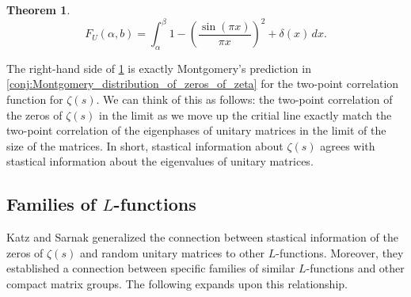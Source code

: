 \documentclass[12pt]{book}
\newtheorem{theorem}{Theorem}[section]
\theoremstyle{definition}\newframedtheorem{method}{Method}
\renewcommand{\a}{\alpha}
\renewcommand{\b}{\beta}
\renewcommand{\d}{\delta}
\newcommand{\z}{\zeta}
\newcommand{\<}{\langle}
\renewcommand{\>}{\rangle}
\begin{document}
      \begin{theorem}\label{thm:Dyson_unitary_distribution}
      \phantom{ }
      \[
        F_{U}(\a,b) = \int_{\a}^{\b}1-\left(\frac{\sin(\pi x)}{\pi x}\right)^{2}+\d(x)\,dx.
      \]
      \end{theorem}

      The right-hand side of \cref{thm:Dyson_unitary_distribution} is exactly Montgomery's prediction in \cref{conj:Montgomery_distribution_of_zeros_of_zeta} for the two-point correlation function for $\z(s)$. We can think of this as follows: the two-point correlation of the zeros of $\z(s)$ in the limit as we move up the critial line exactly match the two-point correlation of the eigenphases of unitary matrices in the limit of the size of the matrices. In short, stastical information about $\z(s)$ agrees with stastical information about the eigenvalues of unitary matrices.
    \subsection*{Families of \texorpdfstring{$L$}{L}-functions}
      Katz and Sarnak generalized the connection between stastical information of the zeros of $\z(s)$ and random unitary matrices to other $L$-functions. Moreover, they established a connection between specific families of similar $L$-functions and other compact matrix groups. The following expands upon this relationship.
\end{document}
